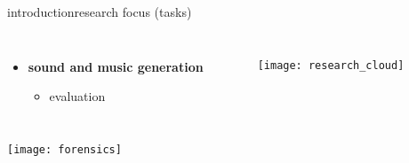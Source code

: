 \begin{frame}{introduction}{research focus (tasks)}
\begin{columns}
\begin{itemize}
         \item<3->  \textbf{sound and music generation}
            \begin{itemize}
                \item   evaluation \cite{yang_evaluation_2020, pati_is_2021, watcharasupat_latte_2022, vinay_evaluating_2022}
            \end{itemize}
    \end{itemize}
    \begin{figure}
        \texttt{[image: research\_cloud]}
    \end{figure}
    \end{columns}
    \vspace{-25mm}
    \begin{flushright}
        \texttt{[image: forensics]}
    \end{flushright}
\end{frame}
        
